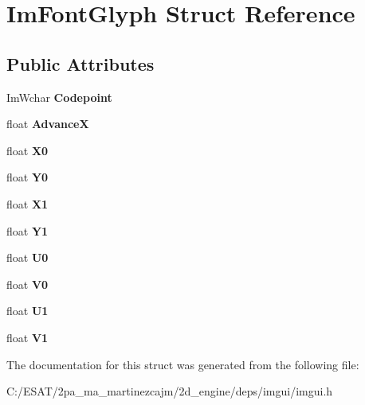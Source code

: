 \hypertarget{struct_im_font_glyph}{}\section{Im\+Font\+Glyph Struct Reference}
\label{struct_im_font_glyph}
\subsection*{Public Attributes}
\begin{DoxyCompactItemize}
\item 
\mbox{\label{struct_im_font_glyph_a3ff56d019068137a3df514caa3961421}} 
Im\+Wchar {\bfseries Codepoint}
\item 
\mbox{\label{struct_im_font_glyph_a11bfab7bcdb497fe2d649745c7d39b33}} 
float {\bfseries AdvanceX}
\item 
\mbox{\label{struct_im_font_glyph_a1e93bf7292c052549972fc46646ff104}} 
float {\bfseries X0}
\item 
\mbox{\label{struct_im_font_glyph_ac1deecd5b352949f30d396a58b68dd09}} 
float {\bfseries Y0}
\item 
\mbox{\label{struct_im_font_glyph_a1d907170d807c5e5f2a43d74b99f0d89}} 
float {\bfseries X1}
\item 
\mbox{\label{struct_im_font_glyph_aa6a0440694ae06c4cf03316498327bd2}} 
float {\bfseries Y1}
\item 
\mbox{\label{struct_im_font_glyph_a3c9d90fb39f6beaf9d69413fa4c8366f}} 
float {\bfseries U0}
\item 
\mbox{\label{struct_im_font_glyph_a26b7b7b9ee43ab67e98af9ea1131ce20}} 
float {\bfseries V0}
\item 
\mbox{\label{struct_im_font_glyph_aaca9625f2d6972016e05fed583db85b0}} 
float {\bfseries U1}
\item 
\mbox{\label{struct_im_font_glyph_a3d28904aad639835cdff3e4416663d7c}} 
float {\bfseries V1}
\end{DoxyCompactItemize}


The documentation for this struct was generated from the following file\+:\begin{DoxyCompactItemize}
\item 
C\+:/\+E\+S\+A\+T/2pa\+\_\+ma\+\_\+martinezcajm/2d\+\_\+engine/deps/imgui/imgui.\+h\end{DoxyCompactItemize}
